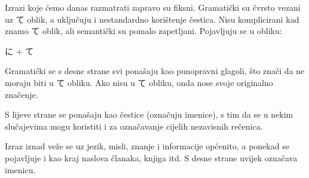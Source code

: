 
\author{Tomislav Mamić}


	
	
	Izrazi koje ćemo danas razmatrati zapravo su fiksni. Gramatički su čvrsto vezani uz て oblik, a uključuju i nestandardno korištenje čestica. Nisu komplicirani kad znamo て oblik, ali semantički su pomalo zapetljani. Pojavljuju se u obliku:
	
	\hspace{30pt} に + て
	
	Gramatički se s desne strane svi ponašaju kao punopravni glagoli, što znači da ne moraju biti u て obliku. Ako nisu u て obliku, onda nose svoje originalno značenje.
	
	S lijeve strane se ponašaju kao čestice (označuju imenice), s tim da se u nekim slučajevima mogu koristiti i za označavanje cijelih nezavisnih rečenica.
	
	\begin{reibun}
	\end{reibun}
	
	Izraz iznad veže se uz jezik, misli, znanje i informacije općenito, a ponekad se pojavljuje i kao kraj naslova članaka, knjiga itd. S desne strane uvijek označava imenicu.
	
	\begin{reibun}
	\end{reibun}

